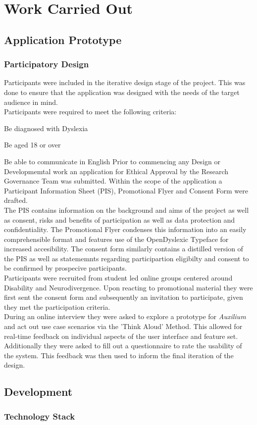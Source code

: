 \documentclass[../main.tex]{subfiles}
\begin{document}
\section{Work Carried Out}
\subsection{Application Prototype}
\subsubsection{Participatory Design}
Participants were included in the iterative design stage of the project. This was done to ensure that the application was designed with the needs of the target audience in mind.\\
Participants were required to meet the following criteria:
\beginitemize
    \item Be diagnosed with Dyslexia
    \item Be aged 18 or over
    \item Be able to communicate in English
\enditemize
Prior to commencing any Design or Developmemtal work an application for Ethical Approval by the Research Governance Team was submitted. Within the scope of the application a Participant Information Sheet (PIS), Promotional Flyer and Consent Form were drafted. \\
The PIS contains information on the background and aims of the project as well as consent, risks and benefits of participation as well as data protection and confidentiality. The Promotional Flyer condenses this information into an easily comprehensible format and features use of the OpenDyslexic Typeface for increased accesibility. The consent form similarly contains a distilled version of the PIS as well as statememnts regarding participartion eligibilty and consent to be confirmed by prospecive participants. \\
Participants were recruited from student led online groups centered around Disability and Neurodivergence. Upon reacting to promotional material they were first sent the consent form and subsequently an invitation to participate, given they met the participation criteria. \\
During an online interview they were asked to explore a prototype for \textit{Auxilium} and act out use case scenarios via the 'Think Aloud' Method. This allowed for real-time feedback on individual aspects of the user interface and feature set. Additionally they were asked to fill out a questionnaire to rate the usability of the system. This feedback was then used to inform the final iteration of the design.
\subsection{Development}
\subsubsection{Technology Stack}
\clearpage
\end{document}
